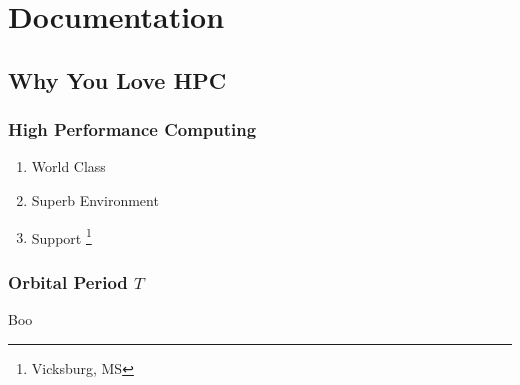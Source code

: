 % 

\section{Documentation}

\subsection{Why You Love HPC}

\begin{frame}\frametitle{High Performance Computing}
\begin{enumerate}
	\item World Class 
	\item Superb  Environment
	\item Support \footnote{Vicksburg, MS}
\end{enumerate}
\end{frame}

\begin{frame}\frametitle{Orbital Period $T$}
Boo
\end{frame}


\endinput  %
